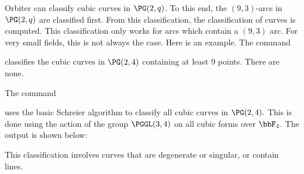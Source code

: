 Orbiter can classify cubic curves in $\PG(2,q)$. 
To this end, the $(9,3)$-arcs in $\PG(2,q)$ are classified first.
From this classification, the classification of curves is computed.
This classification only works for arcs which contain a $(9,3)$ arc. 
For very small fields, this is not always the case. 
Here is an example. The command  


classifies the cubic curves in $\PG(2,4)$ containing at least 9 points.
There are none.





\bigskip


The command  


uses the basic Schreier algorithm to classify all cubic curves in $\PG(2,4).$
This is done using the action of the group $\PGGL(3,4)$ on all cubic forms over $\bbF_4$.
The output is shown below:


This classification involves curves that are degenerate or singular, or contain lines.